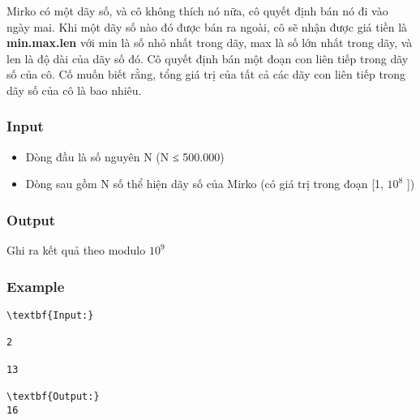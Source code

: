 



   Mirko có một dãy số, và cô không thích nó nữa, cô quyết định bán nó đi vào ngày mai. Khi một dãy số nào đó được bán ra ngoài, cô sẽ nhận được giá tiền là   \textbf{    min.max.len   }   với min là số nhỏ nhất trong dãy, max là số lớn nhất trong dãy, và len là độ dài của dãy số đó. Cô quyết định bán một đoạn con liên tiếp trong dãy số của cô. Cố muốn biết rằng, tổng giá trị của tất cả các dãy con liên tiếp trong dãy số của cô là bao nhiêu.  

\subsubsection{   Input  }
\begin{itemize}
	\item     Dòng đầu là số nguyên N (N ≤ 500.000)   
	\item     Dòng sau gồm N số thể hiện dãy số của Mirko (có giá trị trong đoạn [1, $10^{8}$    ])    \textbf{}
\end{itemize}

\subsubsection{   Output  }

   Ghi ra kết quả theo modulo $10^{9}$

\subsubsection{   Example  }
\begin{verbatim}
\textbf{Input:}

2

13

\textbf{Output:}
16\end{verbatim}
